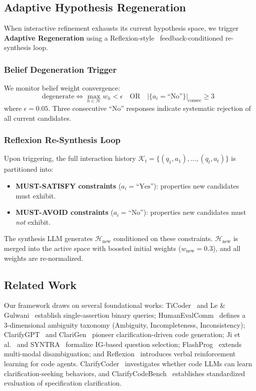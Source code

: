 \documentclass[10pt,conference]{IEEEtran}
\begin{document}
\subsection{Adaptive Hypothesis Regeneration}

When interactive refinement exhausts its current hypothesis space, we trigger \textbf{Adaptive Regeneration} using a Reflexion-style~\cite{reflexion} feedback-conditioned re-synthesis loop.

\subsubsection{Belief Degeneration Trigger}
We monitor belief weight convergence:
\begin{equation}\label{eq:degen}
\text{degenerate} \iff \max_{h \in \mathcal{H}} w_h < \epsilon \quad \text{OR} \quad |\{a_i = \text{``No''}\}|_{\text{consec}} \geq 3
\end{equation}
where $\epsilon = 0.05$. Three consecutive ``No'' responses indicate systematic rejection of all current candidates.

\subsubsection{Reflexion Re-Synthesis Loop}
Upon triggering, the full interaction history $\mathcal{K}_t = \{(q_1, a_1), \ldots, (q_t, a_t)\}$ is partitioned into:
\begin{itemize}
  \item \textbf{MUST-SATISFY constraints} ($a_i = \text{``Yes''}$): properties new candidates must exhibit.
  \item \textbf{MUST-AVOID constraints} ($a_i = \text{``No''}$): properties new candidates must \textit{not} exhibit.
\end{itemize}
The synthesis LLM generates $\mathcal{H}_{\text{new}}$ conditioned on these constraints. $\mathcal{H}_{\text{new}}$ is merged into the active space with boosted initial weights ($w_{\text{new}} = 0.3$), and all weights are re-normalized.

\subsection{Related Work}
Our framework draws on several foundational works: TiCoder~\cite{ticoder} and Le \& Gulwani~\cite{le2017interactive} establish single-assertion binary queries; HumanEvalComm~\cite{humanevalcomm} defines a 3-dimensional ambiguity taxonomy (Ambiguity, Incompleteness, Inconsistency); ClarifyGPT~\cite{clarifygpt} and ClariGen~\cite{clarigen} pioneer clarification-driven code generation; Ji et al.~\cite{ji2020question} and SYNTRA~\cite{syntra} formalize IG-based question selection; FlashProg~\cite{flashprog} extends multi-modal disambiguation; and Reflexion~\cite{reflexion} introduces verbal reinforcement learning for code agents. ClarifyCoder~\cite{clarifycoder} investigates whether code LLMs can learn clarification-seeking behaviors, and ClarifyCodeBench~\cite{clarifycodebench} establishes standardized evaluation of specification clarification.
\end{document}

